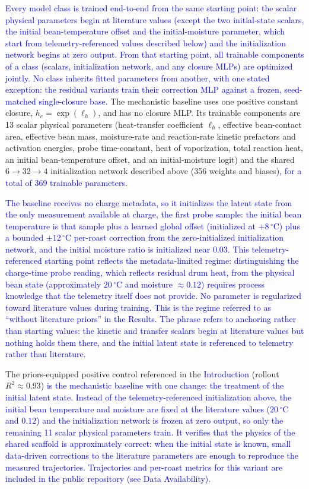 \documentclass[fleqn,10pt]{wlscirep}
\newcommand{\rev}[1]{\textcolor{blue}{#1}}
\begin{document}
\rev{Every model class is trained end-to-end from the same starting point: the scalar physical parameters begin at literature values (except the two initial-state scalars, the initial bean-temperature offset and the initial-moisture parameter, which start from telemetry-referenced values described below) and the initialization network begins at zero output. From that starting point, all trainable components of a class (scalars, initialization network, and any closure MLPs) are optimized jointly. No class inherits fitted parameters from another, with one stated exception: the residual variants train their correction MLP against a frozen, seed-matched single-closure base.} The mechanistic baseline uses one positive constant closure, $h_e = \exp(\ell_h)$, and has no closure MLP. Its trainable components are 13 scalar physical parameters (heat-transfer coefficient $\ell_h$, effective bean-contact area, effective bean mass, moisture-rate and reaction-rate kinetic prefactors and activation energies, probe time-constant, heat of vaporization, total reaction heat, an initial bean-temperature offset, and an initial-moisture logit) and the shared $6\to32\to4$ initialization network described above (356 weights and biases)\rev{, for a total of 369 trainable parameters}.

\rev{The baseline receives no charge metadata, so it initializes the latent state from the only measurement available at charge, the first probe sample: the initial bean temperature is that sample plus a learned global offset (initialized at $+8\,^{\circ}$C) plus a bounded $\pm 12\,^{\circ}$C per-roast correction from the zero-initialized initialization network, and the initial moisture ratio is initialized near $0.03$. This telemetry-referenced starting point reflects the metadata-limited regime: distinguishing the charge-time probe reading, which reflects residual drum heat, from the physical bean state (approximately $20\,^{\circ}$C and moisture $\approx 0.12$) requires process knowledge that the telemetry itself does not provide. No parameter is regularized toward literature values during training.} \rev{This is the regime referred to as ``without literature priors'' in the Results. The phrase refers to anchoring rather than starting values: the kinetic and transfer scalars begin at literature values but nothing holds them there, and the initial latent state is referenced to telemetry rather than literature.}

The priors-equipped positive control referenced in the \rev{Introduction} (rollout $R^2 \approx 0.93$) \rev{is the mechanistic baseline with one change: the treatment of the initial latent state. Instead of the telemetry-referenced initialization above, the initial bean temperature and moisture are fixed at the literature values ($20\,^{\circ}$C and $0.12$) and the initialization network is frozen at zero output, so only the remaining 11 scalar physical parameters train. It verifies that the physics of the shared scaffold is approximately correct: when the initial state is known, small data-driven corrections to the literature parameters are enough to reproduce the measured trajectories.} \rev{Trajectories and per-roast metrics for this variant are included in the public repository (see Data Availability).}
\end{document}
